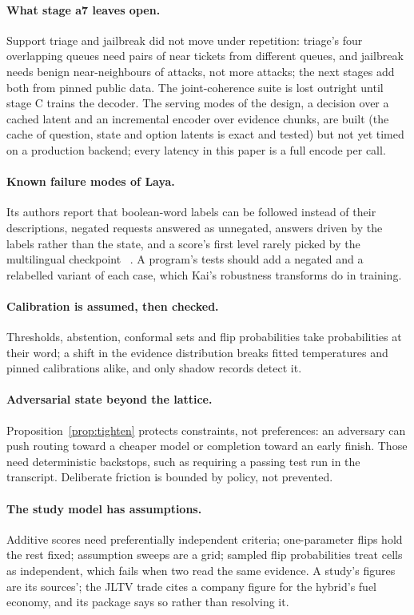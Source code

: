 \paragraph{What stage a7 leaves open.}
Support triage and jailbreak did not move under repetition: triage's four
overlapping queues need pairs of near tickets from different queues, and
jailbreak needs benign near-neighbours of attacks, not more attacks; the next
stages add both from pinned public data. The joint-coherence suite is lost
outright until stage C trains the decoder. The serving modes of the design, a
decision over a cached latent and an incremental encoder over evidence chunks,
are built (the cache of question, state and option latents is exact and
tested) but not yet timed on a production backend; every latency in this paper
is a full encode per call.

\paragraph{Known failure modes of Laya.}
Its authors report that boolean-word labels can be followed instead of their
descriptions, negated requests answered as unnegated,  answers driven
by the labels rather than the state, and a score's first level rarely picked
by the multilingual checkpoint~\cite{laya} \reported. A program's tests should
add a negated and a relabelled variant of each case, which Kai's robustness
transforms do in training.

\paragraph{Calibration is assumed, then checked.}
Thresholds, abstention, conformal sets and flip probabilities take
probabilities at their word; a shift in the evidence distribution breaks fitted
temperatures and pinned calibrations alike, and only shadow records detect
it.

\paragraph{Adversarial state beyond the lattice.}
Proposition~\ref{prop:tighten} protects constraints, not preferences: an
adversary can push routing toward a cheaper model or completion toward an early
finish. Those need deterministic backstops, such as requiring a passing test
run in the transcript. Deliberate friction is bounded by policy, not
prevented.

\paragraph{The study model has assumptions.}
Additive scores need preferentially independent criteria; one-parameter flips
hold the rest fixed; assumption sweeps are a grid; sampled flip probabilities
treat cells as independent, which fails when two read the same evidence. A
study's figures are its sources'; the JLTV trade cites a company figure for the
hybrid's fuel economy, and its package says so rather than resolving it.
